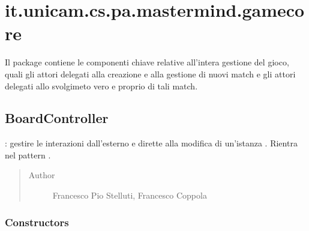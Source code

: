 \documentclass[letterpaper,10pt,italian,openany,oneside]{sphinxmanual}
\begin{document}
\section{it.unicam.cs.pa.mastermind.gamecore}
\label{\detokenize{test/it/unicam/cs/pa/mastermind/gamecore/package-index:it-unicam-cs-pa-mastermind-gamecore}}\label{\detokenize{test/it/unicam/cs/pa/mastermind/gamecore/package-index::doc}}
Il package contiene le componenti chiave relative all’intera gestione del gioco, quali gli attori delegati alla creazione e alla gestione di nuovi match e gli attori delegati allo svolgimeto vero e proprio di tali match.

\label{\detokenize{test/it/unicam/cs/pa/mastermind/gamecore/package-index:package-it.unicam.cs.pa.mastermind.gamecore}}

\subsection{BoardController}
\label{\detokenize{test/it/unicam/cs/pa/mastermind/gamecore/BoardController:boardcontroller}}\label{\detokenize{test/it/unicam/cs/pa/mastermind/gamecore/BoardController::doc}}

\begin{fulllineitems}
\label{\detokenize{test/it/unicam/cs/pa/mastermind/gamecore/BoardController:it.unicam.cs.pa.mastermind.gamecore.BoardController}}
: gestire le interazioni dall’esterno e dirette alla modifica di un’istanza . Rientra nel pattern .
\begin{quote}\begin{description}
\item[{Author}] \leavevmode
Francesco Pio Stelluti, Francesco Coppola

\end{description}\end{quote}

\end{fulllineitems}



\subsubsection{Constructors}
\label{\detokenize{test/it/unicam/cs/pa/mastermind/gamecore/BoardController:constructors}}
\end{document}
